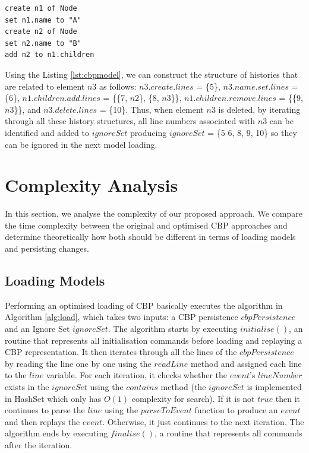\documentclass{llncs}
\begin{document}
\begin{lstlisting}[style=eol,caption={Change-based representation of the model of Fig. \ref{fig:initial_model} after removal of node \emph{n5}.},label=lst:cbpmodel_optimised]
create n1 of Node
set n1.name to "A"
create n2 of Node
set n2.name to "B"
add n2 to n1.children
\end{lstlisting}

Using the Listing \ref{lst:cbpmodel}, we can construct the structure of histories that are related to element $n3$ as follows: $n3$.$create$.$lines$ = \{5\}, $n3$.$name$.$set$.$lines$ = \{6\}, $n1$.$children$.$add$.$lines$ = \{\{7, $n2$\}, \{8, $n3$\}\}, $n1$.$children$.$remove$.$lines$ = \{\{9, $n3$\}\}, and $n3$.$delete$.$lines$ = \{10\}. Thus, when element $n3$ is deleted, by iterating through all these history structures, all line numbers associated with $n3$ can be identified and added to $ignoreSet$ producing $ignoreSet$ = \{5 6, 8, 9, 10\} so they can be ignored in the next model loading.

\section{Complexity Analysis}
\label{sec:complexity_analysis}
In this section, we analyse the complexity of our proposed approach. We compare the time complexity between the original and optimised CBP approaches and determine theoretically how both should be different in terms of loading models and persisting changes.   

\subsection{Loading Models}
Performing an optimised loading of CBP basically executes the algorithm in Algorithm \ref{alg:load}, which takes two inputs: a CBP persistence $cbpPersistence$ and an Ignore Set $ignoreSet$. The algorithm starts by executing $initialise()$, an routine that represents all initialisation commands before loading and replaying a CBP representation. It then iterates through all the lines of the $cbpPersistence$ by reading the line one by one using the $readLine$ method and assigned each line to the $line$ variable. For each iteration, it checks whether the $event$'s $lineNumber$ exists in the $ignoreSet$ using the $contains$ method (the $ignoreSet$ is implemented in HashSet which only has $O(1)$ complexity for search). If it is not $true$ then it continues to parse the $line$ using the $parseToEvent$ function to produce an $event$ and then replays the $event$. Otherwise, it just continues to the next iteration. The algorithm ends by executing $finalise()$, a routine that represents all commands after the iteration.
\end{document}
